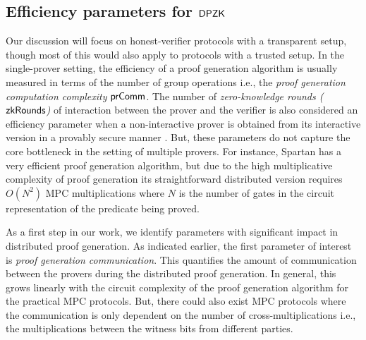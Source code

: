 \subsection{Efficiency parameters for $\mathsf{DPZK}$}
Our discussion will focus on honest-verifier protocols with a transparent setup, though most of this would also apply to protocols with a trusted setup. %
In the single-prover setting, the efficiency of a proof generation algorithm is usually measured in terms of the number of group operations i.e., the \textit{proof generation computation complexity} $\mathsf{prComm}$. The number of \textit{zero-knowledge rounds ($\mathsf{zkRounds}$)} of interaction between the prover and the verifier is also considered an efficiency parameter when a non-interactive prover is obtained from its interactive version in a provably secure manner \cite{BCS16}. But, these parameters do not capture the core bottleneck in the setting of multiple provers. 
For instance, Spartan \cite{spartan} has a very efficient proof generation algorithm, but due to the high multiplicative complexity of proof generation its straightforward distributed version requires $O(N^2)$ MPC multiplications where $N$ is the number of gates in the circuit representation of the predicate being proved. %

As a first step in our work, we identify parameters with significant impact in distributed proof generation. 
As indicated earlier, the first parameter of interest is \textit{proof generation communication}. This quantifies the amount of communication between the provers during the distributed proof generation. In general, this grows linearly with the circuit complexity of the proof generation algorithm for the practical MPC protocols. 
But, there could also exist MPC protocols where the communication is only dependent on the number of cross-multiplications i.e., the multiplications between the witness bits from different parties.%


